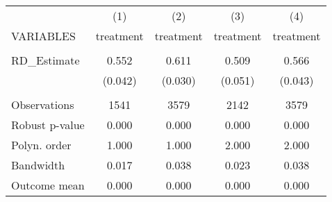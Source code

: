 \documentclass[]{article}
\begin{document}
\begin{tabular}{lcccc} \hline
 & (1) & (2) & (3) & (4) \\
VARIABLES & treatment & treatment & treatment & treatment \\ \hline
 &  &  &  &  \\
RD\_Estimate & 0.552 & 0.611 & 0.509 & 0.566 \\
 & (0.042) & (0.030) & (0.051) & (0.043) \\
 &  &  &  &  \\
Observations & 1541 & 3579 & 2142 & 3579 \\
Robust p-value & 0.000 & 0.000 & 0.000 & 0.000 \\
Polyn. order & 1.000 & 1.000 & 2.000 & 2.000 \\
Bandwidth & 0.017 & 0.038 & 0.023 & 0.038 \\
 Outcome mean & 0.000 & 0.000 & 0.000 & 0.000 \\ \hline
\end{tabular}
\end{document}
